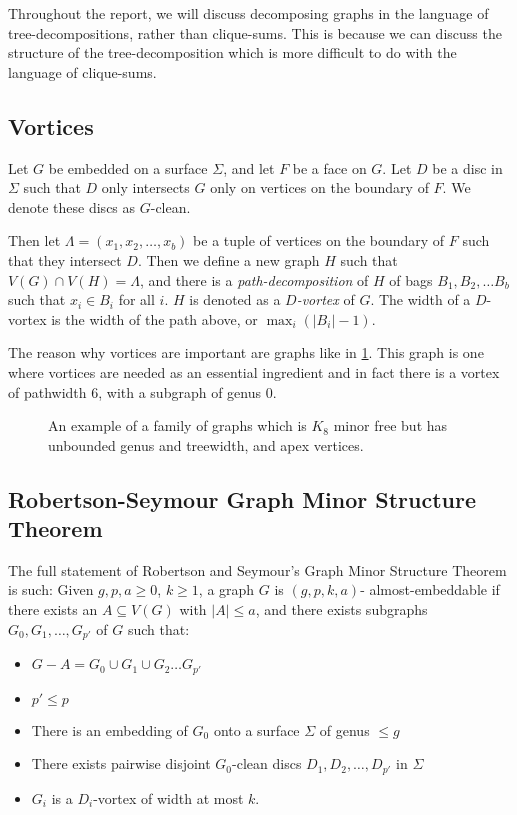 Throughout the report, we will discuss decomposing graphs in the language of tree-decompositions, rather than clique-sums. This is because we can discuss the structure of the tree-decomposition which is more difficult to do with the language of clique-sums.

\subsection{Vortices}\label{sssec:vortices}
Let \(G\) be embedded on a surface \(\Sigma\), and let \(F\) be a face on \(G\). Let \(D\) be a disc in \(\Sigma\) such that \(D\) only intersects \(G\) only on vertices on the boundary of \(F\). We denote these discs as \(G\)-clean. 
\par
Then let \(\Lambda = (x_1, x_2, \ldots, x_b)\) be a tuple of vertices on the boundary of \(F\) such that they intersect \(D\). Then we define a new graph \(H\) such that \(V(G) \cap V(H) = \Lambda\), and there is a \textit{path-decomposition} of \(H\) of bags \(B_1, B_2, \ldots B_b\) such that \(x_i \in B_i\) for all \(i\). \(H\) is denoted as a \textit{\(D\)-vortex} of \(G\). The width of a \(D\)-vortex is the width of the path above, or \(\max_i(|B_i| - 1)\). 
\par
The reason why vortices are important are graphs like in \cref{fig:tenniscourt}. This graph is one where vortices are needed as an essential ingredient and in fact there is a vortex of pathwidth 6, with a subgraph of genus 0.

\begin{figure}[h]
	\centering
	
	\caption{An example of a family of graphs which is \(K_8\) minor free but has unbounded genus and treewidth, and apex vertices. }
	\label{fig:tenniscourt}
\end{figure}
\subsection{Robertson-Seymour Graph Minor Structure Theorem}\label{ssec:Robertson_Seymour_Graph_Structure}
The full statement of Robertson and Seymour's Graph Minor Structure Theorem \cite{robertsonGraphMinorsXVI2003}is such:
Given \(g, p, a \geq 0\), \(k \geq 1\), a graph \(G\) is \((g, p, k, a)\)- almost-embeddable if there exists an \(A \subseteq V(G)\) with \(|A| \leq a\), and there exists subgraphs \(G_0, G_1, \ldots,  G_{p'}\) of \(G\) such that:
\begin{itemize}
	\item \(G - A = G_0 \cup G_1 \cup G_2 \ldots G_{p'}\)
	\item \(p' \leq p\)
	\item There is an embedding of \(G_0\) onto a surface \(\Sigma\) of genus \(\leq g\)
	\item There exists pairwise disjoint \(G_0\)-clean discs \(D_1, D_2, \ldots, D_{p'}\) in \(\Sigma\)
	\item \(G_i\) is a \(D_i\)-vortex of width at most \(k\).
\end{itemize}

